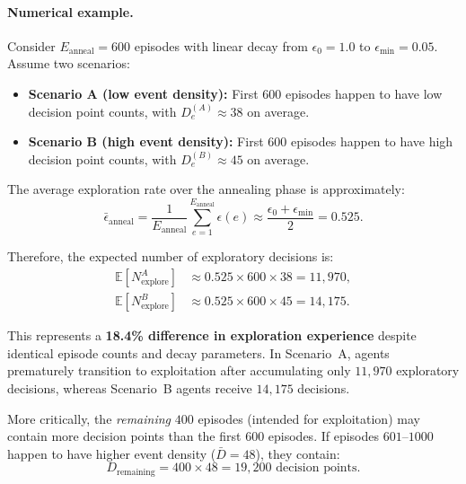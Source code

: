 \paragraph{Numerical example.}
Consider $E_{\mathrm{anneal}}=600$ episodes with linear decay from
$\epsilon_0=1.0$ to $\epsilon_{\min}=0.05$. Assume two scenarios:

\begin{itemize}
\item \textbf{Scenario A (low event density):}  
First $600$ episodes happen to have low decision point counts, with
$D_e^{(A)} \approx 38$ on average.

\item \textbf{Scenario B (high event density):}  
First $600$ episodes happen to have high decision point counts, with
$D_e^{(B)} \approx 45$ on average.
\end{itemize}

The average exploration rate over the annealing phase is approximately:
\begin{equation}
\bar{\epsilon}_{\mathrm{anneal}}
=
\frac{1}{E_{\mathrm{anneal}}} \sum_{e=1}^{E_{\mathrm{anneal}}} \epsilon(e)
\approx
\frac{\epsilon_0 + \epsilon_{\min}}{2}
=
0.525.
\label{eq:avg_epsilon}
\end{equation}

Therefore, the expected number of exploratory decisions is:
\begin{align}
\mathbb{E}[N_{\mathrm{explore}}^{A}]
&\approx 0.525 \times 600 \times 38
= 11{,}970,
\label{eq:expected_explore_a}
\\
\mathbb{E}[N_{\mathrm{explore}}^{B}]
&\approx 0.525 \times 600 \times 45
= 14{,}175.
\label{eq:expected_explore_b}
\end{align}

This represents a \textbf{18.4\% difference in exploration experience} despite
identical episode counts and decay parameters. In Scenario~A, agents prematurely
transition to exploitation after accumulating only $11{,}970$ exploratory
decisions, whereas Scenario~B agents receive $14{,}175$ decisions.

More critically, the \emph{remaining} $400$ episodes (intended for exploitation)
may contain more decision points than the first $600$ episodes. If episodes
$601$–$1000$ happen to have higher event density ($\bar{D}=48$), they contain:
\begin{equation}
D_{\mathrm{remaining}}
=
400 \times 48
=
19{,}200
\text{ decision points}.
\label{eq:remaining_decisions}
\end{equation}


